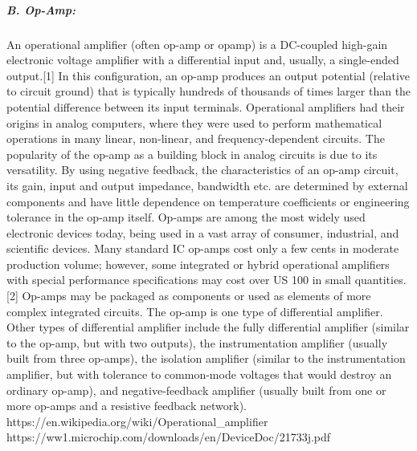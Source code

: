 \subparagraph{B. Op-Amp: }
An operational amplifier (often op-amp or opamp) is a DC-coupled high-gain electronic 
voltage amplifier with a differential input and, usually, a single-ended output.[1] In 
this configuration, an op-amp produces an output potential (relative to circuit ground) 
that is typically hundreds of thousands of times larger than the potential difference 
between its input terminals. Operational amplifiers had their origins in analog computers, 
where they were used to perform mathematical operations in many linear, non-linear, and 
frequency-dependent circuits.
The popularity of the op-amp as a building block in analog circuits is due to its 
versatility. By using negative feedback, the characteristics of an op-amp circuit, its 
gain, input and output impedance, bandwidth etc. are determined by external components 
and have little dependence on temperature coefficients or engineering tolerance in the 
op-amp itself.
Op-amps are among the most widely used electronic devices today, being used in a vast 
array of consumer, industrial, and scientific devices. Many standard IC op-amps cost 
only a few cents in moderate production volume; however, some integrated or hybrid 
operational amplifiers with special performance specifications may cost over US 100 in 
small quantities.[2] Op-amps may be packaged as components or used as elements of more 
complex integrated circuits.
The op-amp is one type of differential amplifier. Other types of differential amplifier 
include the fully differential amplifier (similar to the op-amp, but with two outputs), 
the instrumentation amplifier (usually built from three op-amps), the isolation amplifier 
(similar to the instrumentation amplifier, but with tolerance to common-mode voltages 
that would destroy an ordinary op-amp), and negative-feedback amplifier (usually built 
from one or more op-amps and a resistive feedback network).
https://en.wikipedia.org/wiki/Operational_amplifier\\

https://ww1.microchip.com/downloads/en/DeviceDoc/21733j.pdf\\



